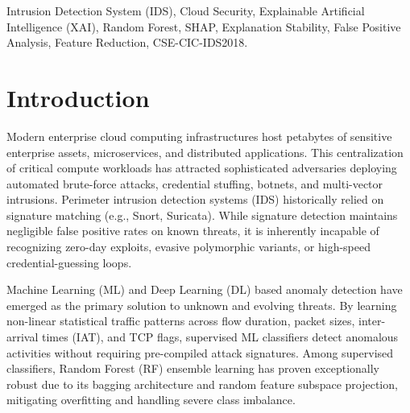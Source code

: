 \documentclass[conference]{IEEEtran}
\begin{document}
\begin{abstract}
\end{abstract}

\begin{IEEEkeywords}
Intrusion Detection System (IDS), Cloud Security, Explainable Artificial Intelligence (XAI), Random Forest, SHAP, Explanation Stability, False Positive Analysis, Feature Reduction, CSE-CIC-IDS2018.
\end{IEEEkeywords}

\section{Introduction}
Modern enterprise cloud computing infrastructures host petabytes of sensitive enterprise assets, microservices, and distributed applications. This centralization of critical compute workloads has attracted sophisticated adversaries deploying automated brute-force attacks, credential stuffing, botnets, and multi-vector intrusions\cite{yang2024idsml, alazab2025deep}. Perimeter intrusion detection systems (IDS) historically relied on signature matching (e.g., Snort, Suricata). While signature detection maintains negligible false positive rates on known threats, it is inherently incapable of recognizing zero-day exploits, evasive polymorphic variants, or high-speed credential-guessing loops\cite{zhang2024shap, singh2025realtime}.

Machine Learning (ML) and Deep Learning (DL) based anomaly detection have emerged as the primary solution to unknown and evolving threats\cite{wang2025feature, nguyen2024efficient}. By learning non-linear statistical traffic patterns across flow duration, packet sizes, inter-arrival times (IAT), and TCP flags, supervised ML classifiers detect anomalous activities without requiring pre-compiled attack signatures. Among supervised classifiers, Random Forest (RF) ensemble learning has proven exceptionally robust due to its bagging architecture and random feature subspace projection, mitigating overfitting and handling severe class imbalance\cite{sharma2025advanced}.
\end{document}
